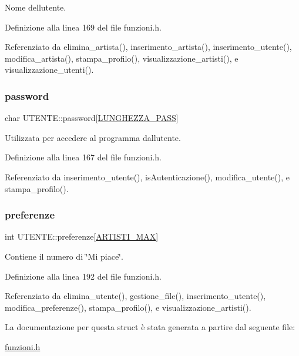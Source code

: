 Nome dell\textquotesingle{}utente. 

Definizione alla linea 169 del file funzioni.\+h.



Referenziato da elimina\+\_\+artista(), inserimento\+\_\+artista(), inserimento\+\_\+utente(), modifica\+\_\+artista(), stampa\+\_\+profilo(), visualizzazione\+\_\+artisti(), e visualizzazione\+\_\+utenti().

\mbox{\label{struct_u_t_e_n_t_e_a04d8337f5e0fe9cd44d36cbe7dac7415}} 
\subsubsection{\texorpdfstring{password}{password}}
{\footnotesize\ttfamily char U\+T\+E\+N\+T\+E\+::password\mbox{[}\mbox{\hyperlink{funzioni_8h_a21981b6e8c0f57093d564c3df476f9ee}{L\+U\+N\+G\+H\+E\+Z\+Z\+A\+\_\+\+P\+A\+SS}}\mbox{]}}

Utilizzata per accedere al programma dall\textquotesingle{}utente. 

Definizione alla linea 167 del file funzioni.\+h.



Referenziato da inserimento\+\_\+utente(), is\+Autenticazione(), modifica\+\_\+utente(), e stampa\+\_\+profilo().

\mbox{\label{struct_u_t_e_n_t_e_a1b4dec4c7ed79c12a76501b634b71176}} 
\subsubsection{\texorpdfstring{preferenze}{preferenze}}
{\footnotesize\ttfamily int U\+T\+E\+N\+T\+E\+::preferenze\mbox{[}\mbox{\hyperlink{funzioni_8h_af17e5297d3cc4c2db33d467698a1b9c2}{A\+R\+T\+I\+S\+T\+I\+\_\+\+M\+AX}}\mbox{]}}

Contiene il numero di \char`\"{}\+Mi piace\char`\"{}. 

Definizione alla linea 192 del file funzioni.\+h.



Referenziato da elimina\+\_\+utente(), gestione\+\_\+file(), inserimento\+\_\+utente(), modifica\+\_\+preferenze(), stampa\+\_\+profilo(), e visualizzazione\+\_\+artisti().



La documentazione per questa struct è stata generata a partire dal seguente file\+:\begin{DoxyCompactItemize}
\item 
\mbox{\hyperlink{funzioni_8h}{funzioni.\+h}}\end{DoxyCompactItemize}
